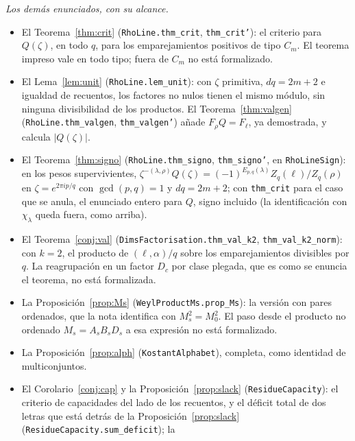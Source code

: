 \documentclass[11pt,a4paper]{article}
\begin{document}
\smallskip
\noindent \emph{Los demás enunciados, con su alcance.}
\begingroup\sloppy
\begin{itemize}
\item El Teorema~\ref{thm:crit} (\texttt{RhoLine.}\allowbreak\texttt{thm\_crit}, \texttt{thm\_crit'}): el criterio para
$Q(\zeta)$, en todo $q$, para los emparejamientos positivos de tipo $C_m$. El teorema impreso vale en
todo tipo; fuera de $C_m$ no está formalizado.
\item El Lema~\ref{lem:unit} (\texttt{RhoLine.}\allowbreak\texttt{lem\_unit}): con $\zeta$ primitiva, $dq=2m+2$ e
igualdad de recuentos, los factores no nulos tienen el mismo módulo, sin ninguna divisibilidad de
los productos. El Teorema~\ref{thm:valgen} (\texttt{RhoLine.}\allowbreak\texttt{thm\_valgen}, \texttt{thm\_valgen'})
añade $F_\rho Q=F_\ell$, ya demostrada, y calcula $|Q(\zeta)|$.
\item El Teorema~\ref{thm:signo} (\texttt{RhoLine.}\allowbreak\texttt{thm\_signo}, \texttt{thm\_signo'}, en
\texttt{RhoLineSign}): en los pesos supervivientes,
$\zeta^{-(\lambda,\rho)}Q(\zeta)=(-1)^{E_{p,q}(\lambda)}Z_q(\ell)/Z_q(\rho)$ en
$\zeta=e^{2\pi ip/q}$ con $\gcd(p,q)=1$ y $dq=2m+2$; con \texttt{thm\_crit} para el caso que se
anula, el enunciado entero para $Q$, signo incluido (la identificación con $\chi_\lambda$ queda
fuera, como arriba).
\item El Teorema~\ref{conj:val} (\texttt{DimsFactorisation.}\allowbreak\texttt{thm\_val\_k2},
\texttt{thm\_val\_k2\_norm}): con $k=2$, el producto de $(\ell,\alpha)/q$ sobre los emparejamientos
divisibles por $q$. La reagrupación en un factor $D_c$ por clase plegada, que es como se enuncia el
teorema, no está formalizada.
\item La Proposición~\ref{prop:Ms} (\texttt{WeylProductMs.}\allowbreak\texttt{prop\_Ms}): la versión con pares
ordenados, que la nota identifica con $M_s^2=M_0^2$. El paso desde el producto no ordenado
$M_s=A_sB_sD_s$ a esa expresión no está formalizado.
\item La Proposición~\ref{prop:alph} (\texttt{KostantAlphabet}), completa, como identidad de
multiconjuntos.
\item El Corolario~\ref{conj:cap} y la Proposición~\ref{prop:slack} (\texttt{ResidueCapacity}): el
criterio de capacidades del lado de los recuentos, y el déficit total de dos letras que está detrás
de la Proposición~\ref{prop:slack} (\texttt{ResidueCapacity.}\allowbreak\texttt{sum\_deficit}); la

\end{itemize}
\end{document}

